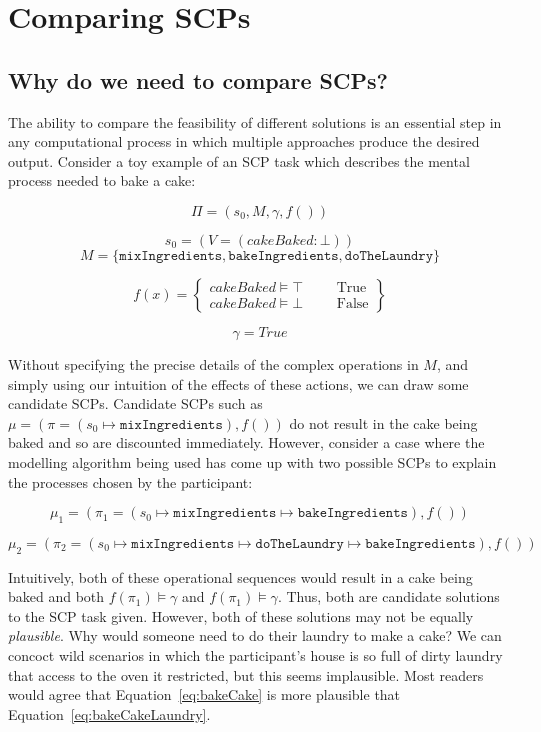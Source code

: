 \chapter{Comparing SCPs} \label{chp:comparing}
\section{Why do we need to compare SCPs?} \label{sec:whyCompare}
The ability to compare the feasibility of different solutions is an essential step in any computational process in which multiple approaches produce the desired output. Consider a toy example of an SCP task which describes the mental process needed to bake a cake:

\[
\Pi = (s_0, M, \gamma, f())
\]

\[
s_0 = (V=(cakeBaked: \bot) )
\]
\[
M=\{\texttt{mixIngredients}, \texttt{bakeIngredients}, \texttt{doTheLaundry}\}
\]

\[
f(x)= \left\{ \begin{matrix} cakeBaked \models \top & & & \textrm{True}\\ cakeBaked \models \bot & & & \textrm{False} \end{matrix} \right\}
\]

\[
\gamma  = True
\]

Without specifying the precise details of the complex operations in $M$, and simply using our intuition of the effects of these actions, we can draw some candidate SCPs. Candidate SCPs such as $\mu=(\pi=(s_0 \longmapsto \texttt{mixIngredients}), f())$ do not result in the cake being baked and so are discounted immediately. However, consider a case where the modelling algorithm being used has come up with two possible SCPs to explain the processes chosen by the participant:

\begin{equation} \label{eq:bakeCake}
\mu_1 = (\pi_1=(s_0\longmapsto \texttt{mixIngredients} \longmapsto \texttt{bakeIngredients}),f())
\end{equation}

\begin{equation} \label{eq:bakeCakeLaundry}
\mu_2 = (\pi_2 = (s_0 \longmapsto \texttt{mixIngredients} \longmapsto  \texttt{doTheLaundry} \longmapsto \texttt{bakeIngredients}),f())
\end{equation}

Intuitively, both of these operational sequences would result in a cake being baked and both $f(\pi_1)\models \gamma$ and $f(\pi_1)\models \gamma$. Thus, both are candidate solutions to the SCP task given. However, both of these solutions may not be equally \textit{plausible}. Why would someone need to do their laundry to make a cake? We can concoct wild scenarios in which the participant's house is so full of dirty laundry that access to the oven it restricted, but this seems implausible. Most readers would agree that Equation~\ref{eq:bakeCake} is more plausible that Equation~\ref{eq:bakeCakeLaundry}.

